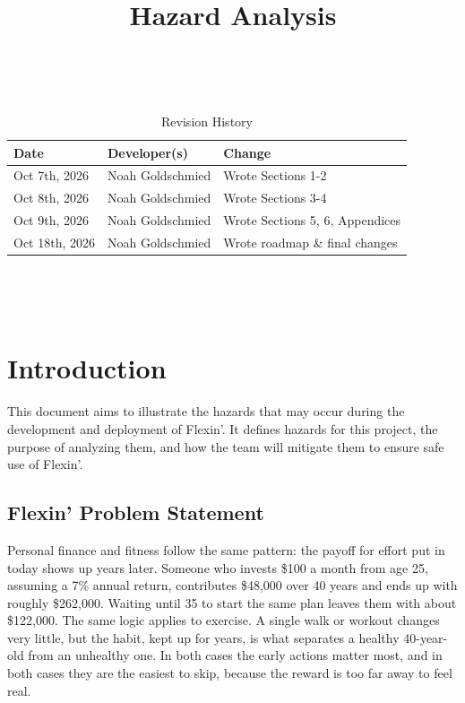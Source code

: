 \documentclass{article}
\title{Hazard Analysis\\\progname}
\author{\authname}
\date{}
\begin{document}
\maketitle
\thispagestyle{empty}

~\newpage


\begin{table}[hp]
\caption{Revision History} \label{TblRevisionHistory}
\begin{tabularx}{\textwidth}{llX}
\toprule
\textbf{Date} & \textbf{Developer(s)} & \textbf{Change}\\
\midrule
Oct 7th, 2026 & Noah Goldschmied & Wrote Sections 1-2\\
Oct 8th, 2026 & Noah Goldschmied & Wrote Sections 3-4\\
Oct 9th, 2026 & Noah Goldschmied & Wrote Sections 5, 6, Appendices\\
Oct 18th, 2026 & Noah Goldschmied & Wrote roadmap \& final changes\\
\bottomrule
\end{tabularx}
\end{table}

~\newpage

\tableofcontents

~\newpage


\section{Introduction}

This document aims to illustrate the hazards that may occur during the development and deployment of Flexin'.
It defines hazards for this project, the purpose of analyzing them, and how the team will mitigate them to ensure safe use of Flexin'.

\subsection{Flexin' Problem Statement}

Personal finance and fitness follow the same pattern: the payoff for effort put
in today shows up years later. Someone who invests \$100 a month from age 25,
assuming a 7\% annual return, contributes \$48,000 over 40 years and ends up with
roughly \$262,000. Waiting until 35 to start the same plan leaves them with about
\$122,000. The same logic applies to exercise. A single walk or workout changes
very little, but the habit, kept up for years, is what separates a healthy
40-year-old from an unhealthy one. In both cases the early actions matter most,
and in both cases they are the easiest to skip, because the reward is too far
away to feel real.
\end{document}
